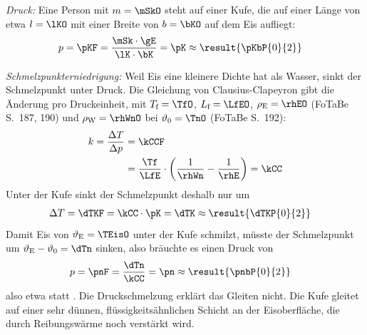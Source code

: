 \emph{Druck:} Eine Person mit $m = \mSkO$ steht auf einer Kufe, die auf einer Länge von etwa $l = \lKO$ mit einer Breite von $b = \bKO$ auf dem Eis aufliegt:
\begin{align}
 p &= \pKF = \frac{\mSk\cdot\gE}{\lK\cdot\bK} = \pK \approx \result{\pKbP{0}{2}}
\end{align}

\emph{Schmelzpunkterniedrigung:} Weil Eis eine kleinere Dichte hat als Wasser, sinkt der Schmelzpunkt unter Druck. Die Gleichung von Clausius-Clapeyron gibt die Änderung pro Druckeinheit, mit $T_\text{f} = \TfO$, $L_\text{f} = \LfEO$, $\rho_\text{E} = \rhEO$ (FoTaBe S.~187, 190) und $\rho_\text{W} = \rhWnO$ bei $\vartheta_0 = \TnO$ (FoTaBe S.~192):
\begin{align}
 k = \frac{\Delta T}{\Delta p} &= \kCCF \\
   &= \frac{\Tf}{\LfE}\cdot\left(\frac{1}{\rhWn}-\frac{1}{\rhE}\right) = \kCC
\end{align}
Unter der Kufe sinkt der Schmelzpunkt deshalb nur um
\begin{align}
 \Delta T &= \dTKF = \kCC\cdot\pK = \dTK \approx \result{\dTKP{0}{2}}
\end{align}
Damit Eis von $\vartheta_\text{E} = \TEisO$ unter der Kufe schmilzt, müsste der Schmelzpunkt um $\vartheta_\text{E}-\vartheta_0 = \dTn$ sinken, also bräuchte es einen Druck von
\begin{align}
 p &= \pnF = \frac{\dTn}{\kCC} = \pn \approx \result{\pnbP{0}{2}}
\end{align}
also etwa  statt . Die Druckschmelzung erklärt das Gleiten nicht. Die Kufe gleitet auf einer sehr dünnen, flüssigkeitsähnlichen Schicht an der Eisoberfläche, die durch Reibungswärme noch verstärkt wird.
